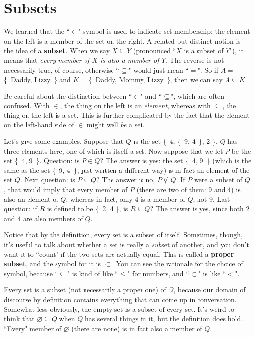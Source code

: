 \section{Subsets}

We learned that the ``$\in$" symbol is used to indicate set membership: the
element on the left is a member of the set on the right. A related but
distinct notion is the idea of a \textbf{subset}.  When we
say $X \subseteq Y$ (pronounced ``$X$ is a subset of $Y$"), it means that
\textit{every member of $X$ is also a member of $Y$.} The reverse is not
necessarily true, of course, otherwise ``$\subseteq$" would just mean
``$=$". So if $A$ = \{~Daddy, Lizzy~\} and $K$ = \{~Daddy, Mommy, Lizzy~\},
then we can say $A \subseteq K$.

Be careful about the distinction between ``$\in$" and ``$\subseteq$", which
are often confused. With $\in$, the thing on the left is an
\textit{element},  whereas with $\subseteq$, the thing on the left is a set.
This is further complicated by the fact that the element on the left-hand
side of $\in$ might well \textit{be} a set.

Let's give some examples. Suppose that $Q$ is the set \{~4, \{~9, 4~\}, 2
\}. $Q$ has three elements here, one of which is itself a set. Now suppose
that we let $P$ be the set \{~4, 9~\}. Question: is $P \in Q$? The answer
is yes: the set \{~4, 9~\} (which is the same as the set \{~9, 4~\}, just
written a different way) is in fact an element of the set $Q$. Next
question: is $P \subseteq Q$? The answer is no, $P \not\subseteq Q$. If $P$
were a subset of $Q$, that would imply that every member of $P$ (there are
two of them: 9 and 4) is also an element of $Q$, whereas in fact, only 4
is a member of $Q$, not 9. Last question: if $R$ is defined to be \{~2, 4
\}, is $R \subseteq Q$? The answer is yes, since both 2 and 4 are also
members of $Q$.

Notice that by the definition, every set is a subset of itself. Sometimes,
though, it's useful to talk about whether a set is really a \textit{sub}set
of another, and you don't want it to ``count" if the two sets are actually
equal. This is called a \textbf{proper subset},  and
the symbol for it is $\subset$. You can see the rationale for the choice of
symbol, because ``$\subseteq$" is kind of like ``$\leq$" for numbers, and
``$\subset$" is like ``$<$".

Every set is a subset (not necessarily a proper one) of $\Omega$, because
our domain of discourse  by
definition contains everything that can come up in conversation. Somewhat
less obviously, the empty set  is a subset of every set.
It's weird to think that $\varnothing \subseteq Q$ when $Q$ has several
things in it, but the definition does hold. ``Every" member of
$\varnothing$ (there are none) is in fact also a member of $Q$.

